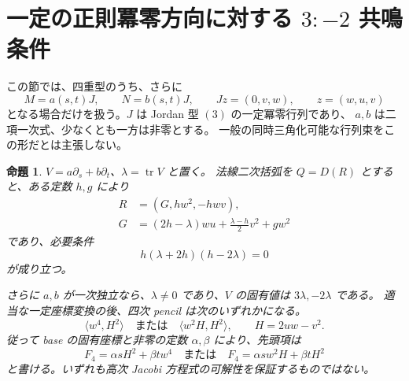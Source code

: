 \documentclass[11pt,a4paper]{ltjsarticle}
\newtheorem{proposition}[theorem]{命題}
\theoremstyle{remark}\newtheorem{remark}[theorem]{注意}
\begin{document}
\section{一定の正則冪零方向に対する \texorpdfstring{$3:-2$}{3:-2} 共鳴条件}
\label{sec:v18-regular-direction}

この節では、四重型のうち、さらに
\[
 M=a(s,t)J,\qquad N=b(s,t)J,\qquad
 Jz=(0,v,w),\qquad z=(w,u,v)
\]
となる場合だけを扱う。$J$ は Jordan 型 $(3)$ の一定冪零行列であり、
$a,b$ は二項一次式、少なくとも一方は非零とする。
一般の同時三角化可能な行列束をこの形だとは主張しない。

\begin{proposition}\label{prop:v18-regular-direction}
$V=a\partial_s+b\partial_t$、$\lambda=\operatorname{tr}V$ と置く。
法線二次括弧を $Q=D(R)$ とすると、ある定数 $h,g$ により
\begin{align*}
 R&=(G,h w^2,-h wv),\\
 G&=(2h-\lambda)wu+\frac{\lambda-h}{2}v^2+g w^2
\end{align*}
であり、必要条件
\begin{equation}\label{eq:v18-resonance-polynomial}
                 h(\lambda+2h)(h-2\lambda)=0
\end{equation}
が成り立つ。

さらに $a,b$ が一次独立なら、$\lambda\ne0$ であり、$V$ の固有値は
$3\lambda,-2\lambda$ である。
適当な一定座標変換の後、四次 pencil は次のいずれかになる。
\begin{equation}\label{eq:v18-two-quartic-pencils}
 \langle w^4,H^2\rangle
 \quad\text{または}\quad
 \langle w^2H,H^2\rangle,
 \qquad H=2uw-v^2.
\end{equation}
従って base の固有座標と非零の定数 $\alpha,\beta$ により、先頭項は
\[
 F_4=\alpha sH^2+\beta t w^4
 \quad\text{または}\quad
 F_4=\alpha s w^2H+\beta tH^2
\]
と書ける。いずれも高次 Jacobi 方程式の可解性を保証するものではない。
\end{proposition}
\end{document}

